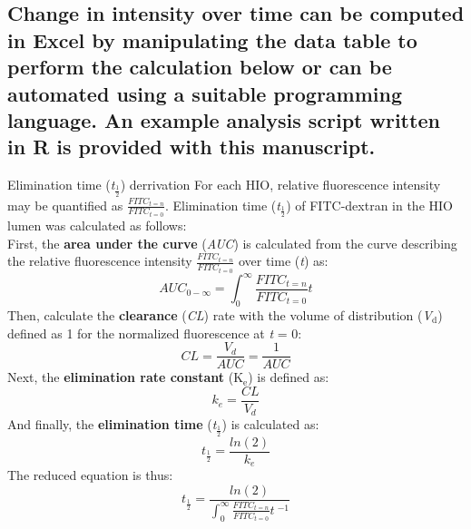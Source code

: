 \documentclass[11pt]{article}
\begin{document}
\subsection{{\sffamily } Change in intensity over time can be computed in Excel by manipulating the data table \supercite{winston2016microsoft} to perform the calculation below or can be automated using a suitable programming language. An example analysis script written in R\supercite{CRAN:2017} is provided with this manuscript.}
\label{sec:orgheadline88}
\begin{bclogo}[logo=\bccrayon, couleurBarre=gray!10, noborder=true, couleur=gray!10]{     Elimination time (\textit{t}$_\frac{1}{2}$) derrivation}
For each HIO, relative fluorescence intensity may be quantified as \(\frac{FITC_{t=n}}{FITC_{t=0}}\). Elimination time\supercite{rosenbaum2016basic} (\textit{t}\(_\frac{1}{2}\)) of FITC-dextran in the HIO lumen was calculated as follows:\\

First, the \textbf{area under the curve} (\emph{AUC}) is calculated from the curve describing the relative fluorescence intensity \(\frac{FITC_{t=n}}{FITC_{t=0}}\) over time (\emph{t}) as:\\
\begin{equation}
AUC_{0-\infty} =  \int_{0}^{\infty} \frac{FITC_{t=n}}{FITC_{t=0}}t
\end{equation}
Then, calculate the \textbf{clearance} (\emph{CL}) rate with the volume of distribution (\emph{V\(_{\text{d}}\)}) defined as 1 for the normalized fluorescence at \emph{t} = 0:\\
\begin{equation}
CL = \frac{V_d}{AUC} = \frac{1}{AUC}
\end{equation}
Next, the \textbf{elimination rate constant} (K\(_{\text{e}}\)) is defined as:\\
\begin{equation}
k_e = \frac{CL}{V_d}
\end{equation}
And finally, the \textbf{elimination time} (\textit{t}\(_\frac{1}{2}\)) is calculated as:\\
\begin{equation}
t_{\frac{1}{2}} = \frac{ln(2)}{k_e}
\end{equation}
The reduced equation is thus:\\
\begin{equation}
t_{\frac{1}{2}} = \frac{ln(2)}{{\int_{0}^{\infty} \frac{FITC_{t=n}}{FITC_{t=0}}t\:^{-1}}}
\end{equation}

\end{bclogo}
\end{document}

